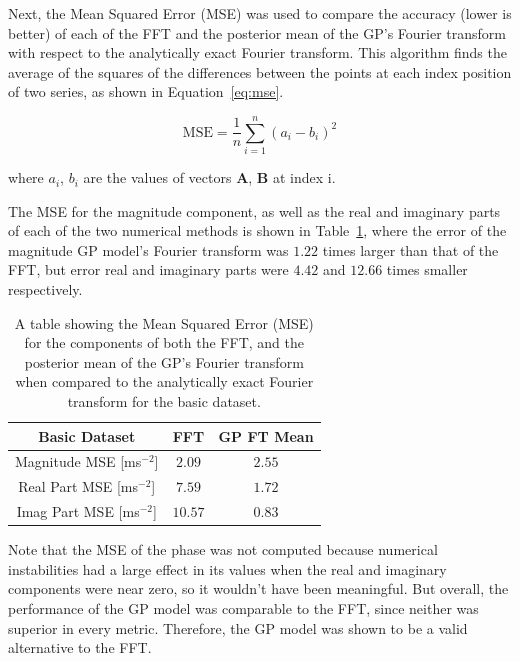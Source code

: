 \documentclass[12pt]{article}
\begin{document}
    Next, the Mean Squared Error (MSE) was used to compare the accuracy (lower is better) of each of the FFT and the posterior mean of the GP's Fourier transform with respect to the analytically exact Fourier transform.
    This algorithm finds the average of the squares of the differences between the points at each index position of two series, as shown in Equation~\ref{eq:mse}.

    \begin{equation}
        \text{MSE} = \frac{1}{n} \sum_{i=1}^{n} (a_i - b_i)^2 \label{eq:mse}
    \end{equation}

    \noindent where $a_i$, $b_i$ are the values of vectors $\mathbf{A}$, $\mathbf{B}$ at index i.

    The MSE for the magnitude component, as well as the real and imaginary parts of each of the two numerical methods is shown in Table~\ref{tab:basic-mse}, where the error of the magnitude GP model's Fourier transform was $1.22$ times larger than that of the FFT, but error real and imaginary parts were $4.42$ and $12.66$ times smaller respectively.

    \begin{table}[H]
        \centering %
        \setlength{\arrayrulewidth}{1pt} %
        \begin{tabular}{|c|c|c|} %
            \hline
            Basic Dataset & FFT & GP FT Mean \\ %
            \hline
            Magnitude MSE [ms$^{-2}$] & $2.09$ & $2.55$ \\
            \hline
            Real Part MSE [ms$^{-2}$] & $7.59$ & $1.72$ \\
            \hline
            Imag Part MSE [ms$^{-2}$] & $10.57$ & $0.83$ \\
            \hline
        \end{tabular}
        \caption{A table showing the Mean Squared Error (MSE) for the components of both the FFT, and the posterior mean of the GP's Fourier transform when compared to the analytically exact Fourier transform for the basic dataset.}
        \label{tab:basic-mse}
    \end{table}

    Note that the MSE of the phase was not computed because numerical instabilities had a large effect in its values when the real and imaginary components were near zero, so it wouldn't have been meaningful.
    But overall, the performance of the GP model was comparable to the FFT, since neither was superior in every metric.
    Therefore, the GP model was shown to be a valid alternative to the FFT\@.
\end{document}
